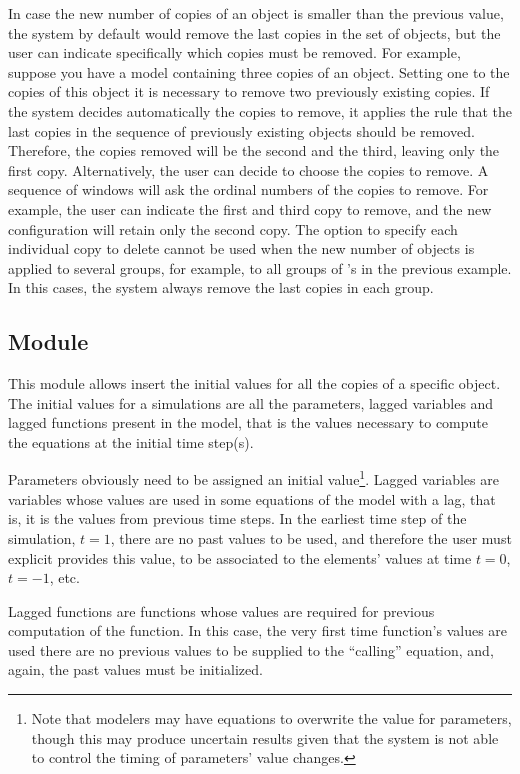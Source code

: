 \documentclass [11pt,a4paper] {book}
\begin{document}
In case the new number of copies of an object is smaller than the previous value, the system by default would remove the last copies in the set of objects, but the user can indicate specifically which copies must be removed. For example, suppose you have a model containing three copies of an object. Setting one to the copies of this object it is necessary to remove two previously existing copies. If the system decides automatically the copies to remove, it applies the rule that the last copies in the sequence of previously existing objects should be removed. Therefore, the copies removed will be the second and the third, leaving only the first copy. Alternatively, the user can decide to choose the copies to remove. A sequence of windows will ask the ordinal numbers of the copies to remove. For example, the user can indicate the first and third copy to remove, and the new configuration will retain only the second copy. The option to specify each individual copy to delete cannot be used when the new number of objects is applied to several groups, for example, to all groups of 's in the previous example. In this cases, the system always remove the last copies in each group.

\subsection{Module }\label{ssec:initval}

This module allows insert the initial values for all the copies of a specific object. The initial values for a simulations are all the parameters, lagged variables and lagged functions present in the model, that is the values necessary to compute the equations at the initial time step(s).

Parameters obviously need to be assigned an initial value\footnote{Note that modelers may have equations to overwrite the value for parameters, though this may produce uncertain results given that the system is not able to control the timing of parameters' value changes.}. Lagged variables are variables whose values are used in some equations of the model with a lag, that is, it is the values from previous time steps. In the earliest time step of the simulation, $t=1$, there are no past values to be used, and therefore the user must explicit provides this value, to be associated to the elements' values at time $t=0$, $t=-1$, etc.

Lagged functions are functions whose values are required for previous computation of the function. In this case, the very first time function's values are used there are no previous values to be supplied to the ``calling'' equation, and, again, the past values must be initialized.
\end{document}
